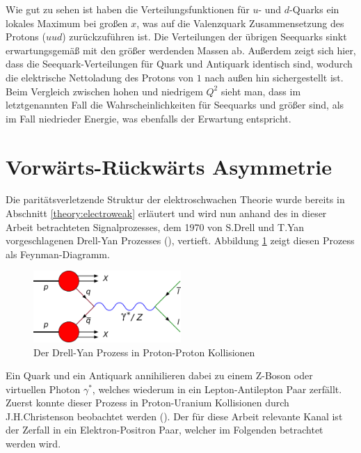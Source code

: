 Wie gut zu sehen ist haben die Verteilungsfunktionen für $u$- und $d$-Quarks
ein lokales Maximum bei großen $x$, was auf die Valenzquark Zusammensetzung des
Protons ($uud$) zurückzuführen ist. Die Verteilungen der übrigen Seequarks
sinkt erwartungsgemäß mit den größer werdenden Massen ab.  Außerdem zeigt sich
hier, dass die Seequark-Verteilungen für Quark und Antiquark identisch sind,
wodurch die elektrische Nettoladung des Protons von $1$ nach außen hin
sichergestellt ist. Beim Vergleich zwischen hohen und niedrigem $Q^2$ sieht
man, dass im letztgenannten Fall die Wahrscheinlichkeiten für Seequarks und
größer sind, als im Fall niedrieder Energie, was ebenfalls der Erwartung
entspricht.




\section{Vorwärts-Rückwärts Asymmetrie}
\label{theory:afb}


Die paritätsverletzende Struktur der elektroschwachen Theorie wurde bereits in
Abschnitt \ref{theory:electroweak} erläutert und wird nun anhand des in dieser
Arbeit betrachteten Signalprozesses, dem 1970 von S.Drell und T.Yan
vorgeschlagenen Drell-Yan Prozesses (\cite{PhysRevLett.25.316}), vertieft.
Abbildung \ref{fig:drell_yan} zeigt diesen Prozess als Feynman-Diagramm.

\begin{figure}[t]
    \centering
    \includegraphics[width=0.5\textwidth]{img/drell_yan}
    \caption{Der Drell-Yan Prozess in Proton-Proton Kollisionen}
    \label{fig:drell_yan}
\end{figure}

Ein Quark und ein Antiquark annihilieren dabei zu einem Z-Boson oder virtuellen
Photon $\gamma^*$, welches wiederum in ein Lepton-Antilepton Paar zerfällt.
Zuerst konnte dieser Prozess in Proton-Uranium Kollisionen durch
J.H.Christenson beobachtet werden (\cite{PhysRevLett.25.1523}). Der für diese
Arbeit relevante Kanal ist der Zerfall in ein Elektron-Positron Paar, welcher
im Folgenden betrachtet werden wird.



